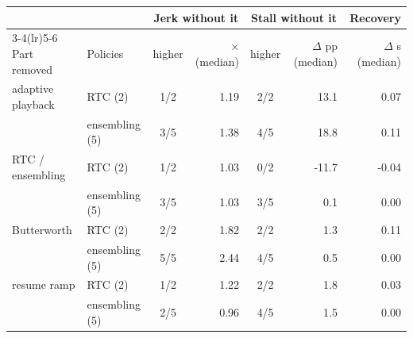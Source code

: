 \begin{tabular}{l l cr cr r}
\toprule
 & & \multicolumn{2}{c}{Jerk without it} & \multicolumn{2}{c}{Stall without it} & Recovery \\
\cmidrule(lr){3-4}\cmidrule(lr){5-6}
Part removed & Policies & higher & $\times$ (median) & higher & $\Delta$ pp (median) & $\Delta$ s (median) \\
\midrule
adaptive playback & RTC (2) & 1/2 & 1.19 & 2/2 & 13.1 & 0.07 \\
 & ensembling (5) & 3/5 & 1.38 & 4/5 & 18.8 & 0.11 \\
\addlinespace
RTC / ensembling & RTC (2) & 1/2 & 1.03 & 0/2 & -11.7 & -0.04 \\
 & ensembling (5) & 3/5 & 1.03 & 3/5 & 0.1 & 0.00 \\
\addlinespace
Butterworth & RTC (2) & 2/2 & 1.82 & 2/2 & 1.3 & 0.11 \\
 & ensembling (5) & 5/5 & 2.44 & 4/5 & 0.5 & 0.00 \\
\addlinespace
resume ramp & RTC (2) & 1/2 & 1.22 & 2/2 & 1.8 & 0.03 \\
 & ensembling (5) & 2/5 & 0.96 & 4/5 & 1.5 & 0.00 \\
\bottomrule
\end{tabular}
